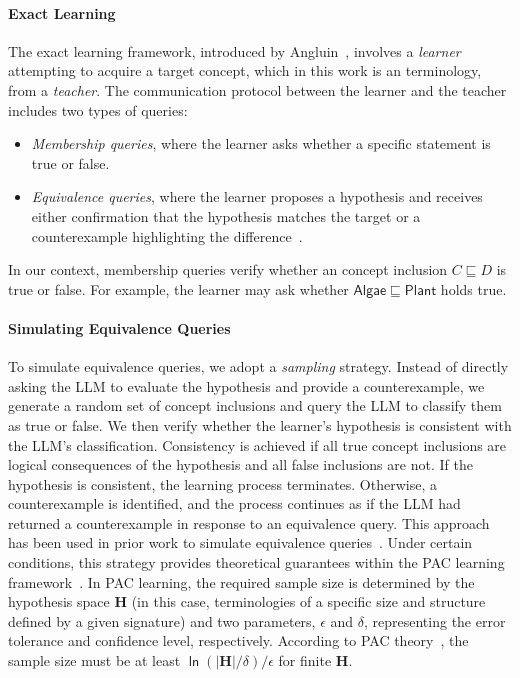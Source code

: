 \paragraph{Exact Learning}
The exact learning framework, introduced by Angluin~\cite{DBLP:journals/ml/Angluin87}, involves a \emph{learner} attempting to acquire a target concept, which in this work is an \EL terminology, from a \emph{teacher}.
%
The communication protocol between the learner and the teacher includes two types of queries:
%
\begin{itemize}
    \item \emph{Membership queries}, where the learner asks whether a specific statement is true or false.
    \item \emph{Equivalence queries}, where the learner proposes a hypothesis and receives either confirmation that the hypothesis matches the target or a counterexample highlighting the difference~\cite{DBLP:journals/ml/Angluin87}.
\end{itemize}
%
In our context, membership queries verify whether an \EL concept inclusion \(C \sqsubseteq D\) is true or false.
%
For example, the learner may ask whether \(\mathsf{Algae} \sqsubseteq \mathsf{Plant}\) holds true.


\paragraph{Simulating Equivalence Queries}
To simulate equivalence queries, we adopt a \emph{sampling} strategy.
%
Instead of directly asking the \gls{LLM} to evaluate the hypothesis and provide a counterexample, we generate a random set of \EL concept inclusions and query the \gls{LLM} to classify them as true or false.
%
We then verify whether the learner's hypothesis is consistent with the \gls{LLM}'s classification.
%
Consistency is achieved if all true concept inclusions are logical consequences of the hypothesis and all false inclusions are not.
%
If the hypothesis is consistent, the learning process terminates.
%
Otherwise, a counterexample is identified, and the process continues as if the \gls{LLM} had returned a counterexample in response to an equivalence query.
%
This approach has been used in prior work to simulate equivalence queries~\cite{DBLP:journals/ml/WeissGY24,BLUM2023109026}.
%
Under certain conditions, this strategy provides theoretical guarantees within the \gls{PAC} learning framework~\cite{DBLP:journals/ml/Angluin87,DBLP:journals/cacm/Valiant84}.
%
In \gls{PAC} learning, the required sample size is determined by the hypothesis space \(\mathbf{H}\) (in this case, \EL terminologies of a specific size and structure defined by a given signature) and two parameters, \(\epsilon\) and \(\delta\), representing the error tolerance and confidence level, respectively.
%
According to \gls{PAC} theory~\cite[Cor. 2.3]{DBLP:books/daglib/0033642}, the sample size must be at least \(\mathsf{\ln}(|\mathbf{H}|/\delta)/\epsilon\) for finite \(\mathbf{H}\).


